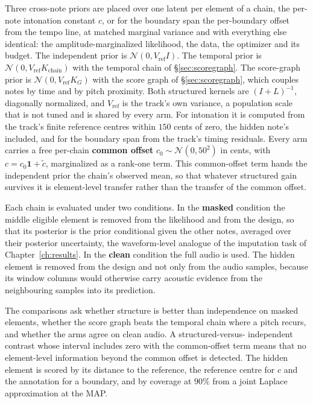 \documentclass[11pt,a4paper]{report}
\newcommand{\N}{\mathcal{N}}
\begin{document}
Three cross-note priors are placed over one latent per element of a chain,
the per-note intonation constant $c$, or for the boundary span the
per-boundary offset from the tempo line, at matched marginal variance and with
everything else identical: the amplitude-marginalized likelihood, the data,
the optimizer and its budget. The independent prior is $\N(0, V_{\mathrm{ref}} I)$.
The temporal prior is $\N(0, V_{\mathrm{ref}} K_{\mathrm{chain}})$ with the
temporal chain of \S\ref{sec:scoregraph}. The score-graph prior is $\N(0, V_{\mathrm{ref}} K_{G})$
with the score graph of \S\ref{sec:scoregraph}, which couples notes by time
and by pitch proximity. Both structured kernels are $(I+L)^{-1}$,
diagonally normalized, and $V_{\mathrm{ref}}$ is the track's own
variance, a population scale that is not tuned and is shared by every arm.
For intonation it is computed from the track's finite reference centres
within $150$ cents of zero, the hidden note's included, and for the
boundary span from the track's timing residuals. Every arm carries a free
per-chain \textbf{common offset} $c_0 \sim \N(0, 50^2)$ in cents, with
$c = c_0\mathbf{1} + \tilde c$, marginalized as a rank-one term. This
common-offset term hands the independent prior the chain's observed mean,
so that whatever structured gain survives it is element-level transfer
rather than the transfer of the common offset.

Each chain is evaluated under two conditions. In the \textbf{masked}
condition the middle eligible element is removed from the likelihood and
from the design, so that its posterior is the prior conditional given the
other notes, averaged over their posterior uncertainty, the waveform-level
analogue of the imputation task of Chapter~\ref{ch:results}. In the \textbf{clean}
condition the full audio is used. The hidden element is removed from the
design and not only from the audio samples, because its window columns
would otherwise carry acoustic evidence from the neighbouring samples into
its prediction.

The comparisons ask whether structure is better than independence on masked
elements, whether the score graph beats the temporal chain where a pitch
recurs, and whether the arms agree on clean audio. A structured-versus-
independent contrast whose interval includes zero with the common-offset
term means that no element-level information beyond the common offset is
detected. The hidden element is scored by its distance to the reference,
the reference centre for $c$ and the annotation for a boundary, and by
coverage at $90\%$ from a joint Laplace approximation at the MAP.
\end{document}
